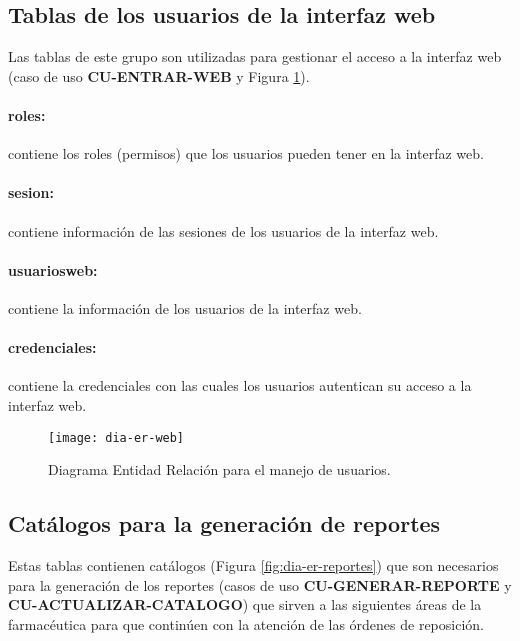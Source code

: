 \subsection{Tablas de los usuarios de la interfaz web}
Las tablas de este grupo son utilizadas para gestionar el acceso a la interfaz web (caso de uso \textbf{CU-ENTRAR-WEB} y Figura \ref{fig:dia-er-web}).
\paragraph{roles:} contiene los roles (permisos) que los usuarios pueden tener en la interfaz web.
\paragraph{sesion:} contiene información de las sesiones de los usuarios de la interfaz web.
\paragraph{usuarios{\textunderscore}web:} contiene la información de los usuarios de la interfaz web.
\paragraph{credenciales:} contiene la credenciales con las cuales los usuarios autentican su acceso a la interfaz web.
\begin{figure}[h]
  \centering
  \texttt{[image: dia-er-web]} 
  \caption{Diagrama Entidad Relación para el manejo de usuarios.}
  \label{fig:dia-er-web}
\end{figure}
\subsection{Catálogos para la generación de reportes}
Estas tablas contienen catálogos (Figura \ref{fig:dia-er-reportes}) que son necesarios para la generación de los reportes (casos de uso \textbf{CU-GENERAR-REPORTE} y \textbf{CU-ACTUALIZAR-CATALOGO}) que sirven a las siguientes áreas de la farmacéutica para que continúen con la atención de las órdenes de reposición.
